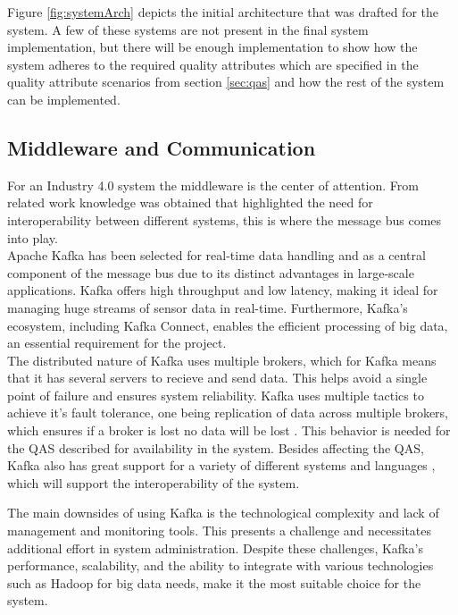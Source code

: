 Figure \ref{fig:systemArch} depicts the initial architecture that was drafted for the system. A few of these systems are not present in the final system implementation, but there will be enough implementation to show how the system adheres to the required quality attributes which are specified in the quality attribute scenarios from section \ref{sec:qas} and how the rest of the system can be implemented.
\subsection{\textbf{Middleware and Communication}}
For an Industry 4.0 system the middleware is the center of attention. From related work knowledge was obtained that highlighted the need for interoperability between different systems, this is where the message bus comes into play. \vspace{2mm} \\
Apache Kafka \cite{Apache2022Connect} has been selected for real-time data handling and as a central component of the message bus due to its distinct advantages in large-scale applications. Kafka offers high throughput and low latency, making it ideal for managing huge streams of sensor data in real-time. Furthermore, Kafka's ecosystem, including Kafka Connect, enables the efficient processing of big data, an essential requirement for the project. \vspace{2mm} \\

The distributed nature of Kafka uses multiple brokers, which for Kafka means that it has several servers to recieve and send data. This helps avoid a single point of failure and ensures system reliability. Kafka uses multiple tactics to achieve it's fault tolerance, one being replication of data across multiple brokers, which ensures if a broker is lost no data will be lost \cite{AltexSoft_2022}. This behavior is needed for the QAS described for availability in the system.
Besides affecting the QAS, Kafka also has great support for a variety of different systems and languages \cite{AltexSoft_2022}, which will support the interoperability of the system. \vspace{2mm}

The main downsides of using Kafka is the technological complexity and lack of management and monitoring tools. This presents a challenge and necessitates additional effort in system administration. Despite these challenges, Kafka's performance, scalability, and the ability to integrate with various technologies such as Hadoop for big data needs, make it the most suitable choice for the system. \vspace{2mm}


